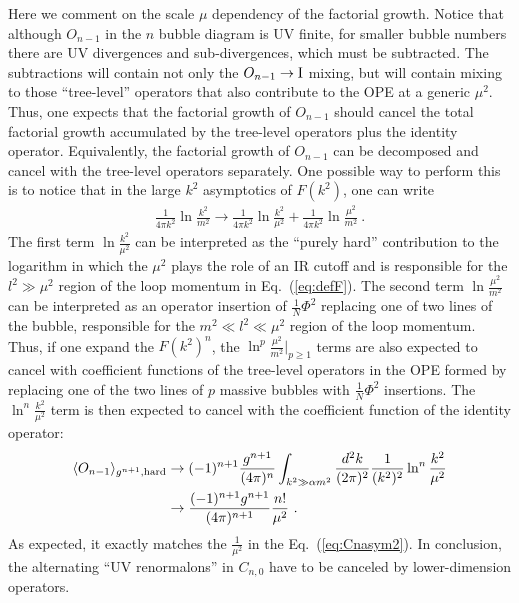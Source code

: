 \documentclass[a4paper,11pt]{article}
\begin{document}
Here we comment on the scale $\mu$ dependency of the factorial growth. Notice that although $O_{n-1}$ in the $n$ bubble diagram is UV finite, for
smaller bubble numbers there are UV divergences and sub-divergences, which must be subtracted. The subtractions will contain not only the $O_{n-1}\rightarrow{\rm I}$ mixing, but will contain mixing to those ``tree-level'' operators that also contribute to the OPE at a generic $\mu^2$. Thus, one expects that the factorial growth of $O_{n-1}$ should cancel the total factorial growth accumulated by the tree-level operators plus the identity operator. Equivalently, the factorial growth of $O_{n-1}$ can be decomposed  and cancel with the tree-level operators separately. One possible way to perform this is to notice that in the large $k^2$ asymptotics of $F(k^2)$, one can write
\begin{align} \label{eq:Ddecomp}
\frac{1}{4\pi k^2}\ln \frac{k^2}{m^2}\rightarrow\frac{1}{4\pi k^2}\ln \frac{k^2}{\mu^2}+\frac{1}{4\pi k^2}\ln \frac{\mu^2}{m^2} \ .
\end{align}
The first term $\ln \frac{k^2}{\mu^2}$ can be interpreted as the ``purely hard'' contribution to the logarithm in which the $\mu^2$ plays the role of an IR cutoff and is responsible for the $l^2 \gg \mu^2$ region of the loop momentum in Eq.~(\ref{eq:defF}). The second term $\ln \frac{\mu^2}{m^2}$ can be interpreted as an operator insertion of $\frac{1}{N}\Phi^2$ replacing one of two lines of the bubble, responsible for the $m^2\ll l^2 \ll \mu^2$ region of the loop momentum. Thus, if one expand the $F(k^2)^{n}$, the $\ln^p \frac{\mu^2}{m^2}|_{p\ge 1}$ terms are also expected to cancel with coefficient functions of the tree-level operators in the OPE formed by replacing one of the two lines of $p$ massive bubbles with $\frac{1}{N}\Phi^2$ insertions. The $\ln^n \frac{k^2}{\mu^2}$ term is then expected to cancel with the coefficient function of the identity operator:
\begin{align}
\langle O_{n-1} \rangle_{g^{n+1},{\rm hard}} &\rightarrow (-1)^{n+1}\frac{g^{n+1}}{(4\pi)^{n}}\int_{k^2\gg \alpha m^2}\frac{d^2k}{(2\pi)^2}\frac{1}{(k^2)^2}\ln^{n}\frac{k^2}{\mu^2} \nonumber 
 \\ &\rightarrow \frac{(-1)^{n+1}g^{n+1}}{(4\pi)^{n+1}}\frac{n!}{\mu^2} \ . \label{eq:operatoralshard}
\end{align}
As expected, it exactly matches the $\frac{1}{\mu^2}$ in the Eq.~(\ref{eq:Cnasym2}). In conclusion, the alternating ``UV renormalons'' in $C_{n,0}$ have to be canceled by lower-dimension operators. 
\end{document}
